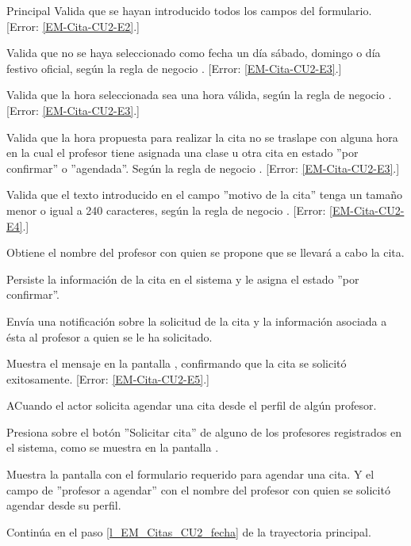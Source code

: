 \begin{UCtrayectoria}{Principal}
	\UCpaso Valida que se hayan introducido todos los campos del formulario. [Error: \ref{EM-Cita-CU2-E2}.]

	\UCpaso Valida que no se haya seleccionado como fecha un día sábado, domingo o día festivo oficial, según la regla de negocio . [Error: \ref{EM-Cita-CU2-E3}.]

	\UCpaso Valida que la hora seleccionada sea una hora válida, según la regla de negocio . [Error: \ref{EM-Cita-CU2-E3}.]

	\UCpaso Valida que la hora propuesta para realizar la cita no se traslape con alguna hora en la cual el profesor tiene asignada una clase u otra cita en estado ''por confirmar'' o ''agendada''. Según la regla de negocio . [Error: \ref{EM-Cita-CU2-E3}.]

	\UCpaso Valida que el texto introducido en el campo ''motivo de la cita'' tenga un tamaño menor o igual a 240 caracteres, según la regla de negocio . [Error: \ref{EM-Cita-CU2-E4}.]

	\UCpaso Obtiene el nombre del profesor con quien se propone que se llevará a cabo la cita.

	\UCpaso Persiste la información de la cita en el sistema y le asigna el estado ''por confirmar''.

	\UCpaso Envía una notificación sobre la solicitud de la cita y la información asociada a ésta al profesor a quien se le ha solicitado.

	\UCpaso Muestra el mensaje  en la pantalla , confirmando que la cita se solicitó exitosamente. [Error: \ref{EM-Cita-CU2-E5}.]

\end{UCtrayectoria}

\begin{UCtrayectoriaA}{A}{Cuando el actor solicita agendar una cita desde el perfil de algún profesor.}

	\UCpaso [\UCactor] Presiona sobre el botón ''Solicitar cita'' de alguno de los profesores registrados en el sistema, como se muestra en la pantalla .

	\UCpaso Muestra la pantalla  con el formulario requerido para agendar una cita. Y el campo de ''profesor a agendar'' con el nombre del profesor con quien se solicitó agendar desde su perfil.

	\UCpaso Continúa en el paso \ref{l_EM_Citas_CU2_fecha} de la trayectoria principal.

\end{UCtrayectoriaA}

